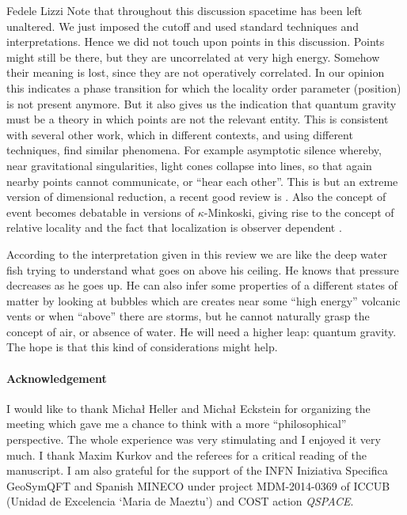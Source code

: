 \begin{artengenv}{Fedele Lizzi}
Note that throughout this discussion spacetime has been left unaltered. We just imposed the cutoff and used standard techniques and interpretations. Hence we did not touch upon points in this discussion.  Points might still be there, but they are uncorrelated at very high energy. Somehow their meaning is lost, since they are not operatively correlated. In our opinion this indicates a phase transition for which the locality order parameter (position) is not present anymore.
 But it also gives us the indication that quantum gravity must be a theory in which points are not the relevant entity.
This is consistent with several other work, which in different contexts, and using different techniques, find similar phenomena. For example asymptotic silence whereby, near gravitational singularities, light cones collapse into lines, so that again nearby points cannot communicate, or ``hear each other''.  This is but an extreme version of dimensional reduction, a recent good review is \parencite{Carlip}. Also the concept of event becomes debatable in versions of $\kappa$-Minkoski, giving rise to the concept of relative locality \parencite{relaloc} and the fact that localization is observer dependent \parencite{LMM}.





According to the interpretation given in this review we are like the deep water fish trying to understand what goes on above his ceiling.
He knows that pressure decreases as he goes up. He can also infer some properties of a different states of matter by looking at bubbles which are creates near some ``high energy'' volcanic vents or when ``above'' there are storms, but he cannot naturally grasp the concept of air, or absence of water.
He will need a higher leap: quantum gravity. The hope is that this kind of considerations might help.

\paragraph{Acknowledgement}
I would like to thank Micha\l{} Heller and Micha\l{} Eckstein for organizing the meeting which gave me a chance to think with a more ``philosophical'' perspective. The whole experience was very stimulating and I enjoyed it very much. I thank Maxim Kurkov and the referees for a critical reading of the manuscript.
I am also grateful for the support of the INFN Iniziativa Specifica GeoSymQFT and Spanish
MINECO under project MDM-2014-0369 of ICCUB (Unidad de Excelencia `Maria de Maeztu') and  COST action \emph{QSPACE}.



\end{artengenv}

  
